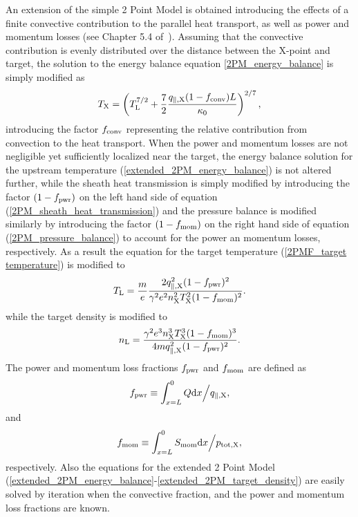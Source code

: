 \documentclass[amsmath,amssymb,a4]{revtex4-2}
\begin{document}
An extension of the simple 2 Point Model is obtained introducing the effects of a finite convective contribution to the parallel heat transport, as well as power and momentum losses (see Chapter 5.4 of~\cite{stangeby}). Assuming that the convective contribution is evenly distributed over the distance between the X-point and target, the solution to the energy balance equation \ref{2PM_energy_balance} is simply modified as
\begin{equation}\label{extended_2PM_energy_balance}
    T_{\rm X} = \left(T_{\rm L}^{7/2} + {7 \over 2} {q_{\parallel,\rm X} (1 - f_{\rm conv}) L \over \kappa_0}\right)^{2/7},
\end{equation}
introducing the factor $f_{\rm conv}$ representing the relative contribution from convection to the heat transport. When the power and momentum losses are not negligible yet sufficiently localized near the target, the energy balance solution for the upstream temperature (\ref{extended_2PM_energy_balance}) is not altered further, while the sheath heat transmission is simply modified by introducing the factor $(1-f_{\rm pwr})$ on the left hand side of equation (\ref{2PM_sheath_heat_transmission}) and the pressure balance is modified similarly by introducing the factor $(1-f_{\rm mom})$ on the right hand side of equation (\ref{2PM_pressure_balance}) to account for the power an momentum losses, respectively. As a result the equation for the target temperature (\ref{2PMF_target temperature}) is modified to
\begin{equation}\label{extended_2PM_target_temperature}
    T_{\rm L} = {m \over e} {2 q_{\parallel,\rm X}^2 (1-f_{\rm pwr})^2 \over \gamma^2 e^2 n_{\rm X}^2 T_{\rm X}^2 (1-f_{\rm mom})^2}.
\end{equation}
while the target density is modified to
\begin{equation}\label{extended_2PM_target_density}
    n_{\rm L} = {\gamma^2 e^3 n_{\rm X}^3 T_{\rm X}^3 (1-f_{\rm mom})^3 \over 4 m q_{\parallel,\rm X}^2 (1-f_{\rm pwr})^2}.
\end{equation}
The power and momentum loss fractions $f_{\rm pwr}$ and $f_{\rm mom}$ are defined as
\begin{equation}\label{power_loss_fraction}
    f_{\rm pwr} \equiv \int_{x=L}^0 Q {\rm d}x \Big/ q_{\parallel,\rm X},
\end{equation}
and
\begin{equation}\label{momentum_loss_fraction}
    f_{\rm mom} \equiv \int_{x=L}^0 S_{\rm mom} {\rm d}x \Big/ p_{\rm tot,X},
\end{equation}
respectively. Also the equations for the extended 2 Point Model (\ref{extended_2PM_energy_balance}-\ref{extended_2PM_target_density}) are easily solved by iteration when the convective fraction, and the power and momentum loss fractions are known.
\end{document}
